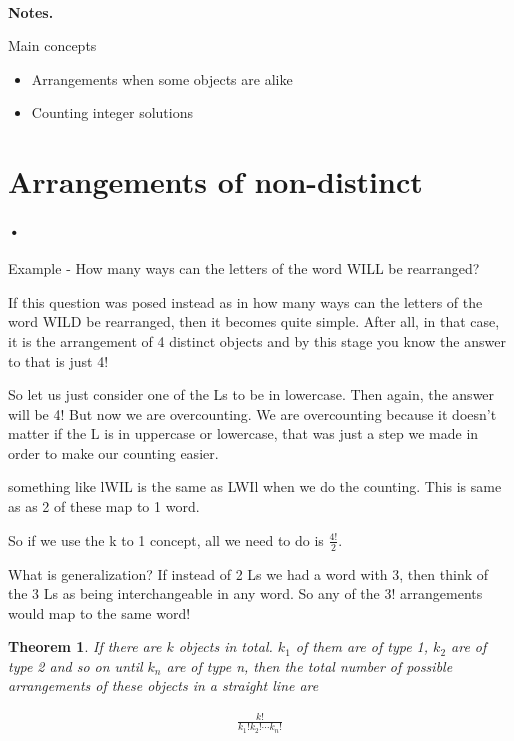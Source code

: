 \documentclass[12pt]{article}
\newtheorem{theorem}{Theorem}
\begin{document}
\begin{center}
\\
\vspace{1cm}
\end{center}


\medskip\noindent

{\bf Notes.}

Main concepts

\begin{itemize}
\item Arrangements when some objects are alike
\item Counting integer solutions
\end{itemize}
\vspace{0.5cm}\noindent

\section*{Arrangements of non-distinct}

\paragraph*{•}
Example - How many ways can the letters of the word WILL be rearranged?

If this question was posed instead as in how many ways can the letters of the word WILD be rearranged, then it becomes quite simple. After all, in that case, it is the arrangement of 4 distinct objects and by this stage you know the answer to that is just 4!

So let us just consider one of the Ls to be in lowercase. Then again, the answer will be 4! But now we are overcounting. We are overcounting because it doesn't matter if the L is in uppercase or lowercase, that was just a step we made in order to make our counting easier.

something like lWIL is the same as LWIl when we do the counting. This is same as as 2 of these map to 1 word.

So if we use the k to 1 concept, all we need to do is $\frac{4!}{2}$.

What is generalization? If instead of 2 Ls we had a word with 3, then think of the 3 Ls as being interchangeable in any word. So any of the 3! arrangements would map to the same word!

\begin{theorem}
If there are $k$ objects in total. $k_1$ of them are of type 1, $k_2$ are of type 2 and so on until $k_n$ are of type n, then the total number of possible arrangements of these objects in a straight line are 

\begin{align*}
\frac{k!}{k_1!k_2!\cdots k_n!}
\end{align*}

\end{theorem}
\end{document}
